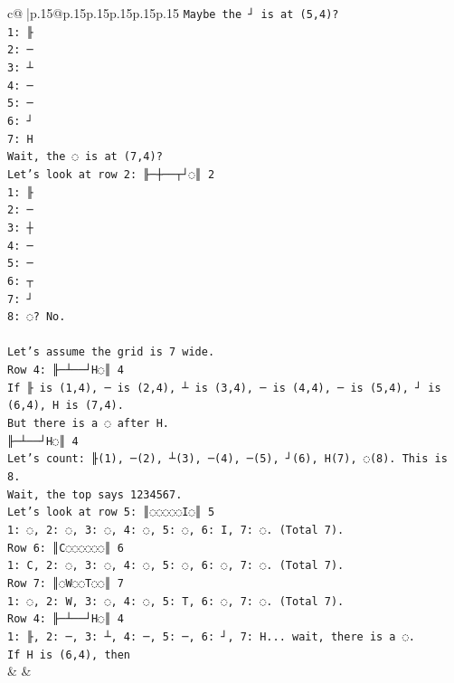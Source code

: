\documentclass{article}
\begin{document}
{\begin{supertabular}{c@{$\;$}|p{.15\linewidth}@{}p{.15\linewidth}p{.15\linewidth}p{.15\linewidth}p{.15\linewidth}p{.15\linewidth}}
{{{\texttt{Maybe the ┘ is at (5,4)?} \\
\texttt{1: ╟} \\
\texttt{2: ─} \\
\texttt{3: ┴} \\
\texttt{4: ─} \\
\texttt{5: ─} \\
\texttt{6: ┘} \\
\texttt{7: H} \\
\texttt{Wait, the ◌ is at (7,4)?} \\
\texttt{Let's look at row 2: ╟─┼──┬┘◌║ 2} \\
\texttt{1: ╟} \\
\texttt{2: ─} \\
\texttt{3: ┼} \\
\texttt{4: ─} \\
\texttt{5: ─} \\
\texttt{6: ┬} \\
\texttt{7: ┘} \\
\texttt{8: ◌? No.} \\
\\ 
\texttt{Let's assume the grid is 7 wide.} \\
\texttt{Row 4: ╟─┴──┘H◌║ 4} \\
\texttt{If ╟ is (1,4), ─ is (2,4), ┴ is (3,4), ─ is (4,4), ─ is (5,4), ┘ is (6,4), H is (7,4).} \\
\texttt{But there is a ◌ after H.} \\
\texttt{╟─┴──┘H◌║ 4} \\
\texttt{Let's count: ╟(1), ─(2), ┴(3), ─(4), ─(5), ┘(6), H(7), ◌(8). This is 8.} \\
\texttt{Wait, the top says  1234567.} \\
\texttt{Let's look at row 5: ║◌◌◌◌◌I◌║ 5} \\
\texttt{1: ◌, 2: ◌, 3: ◌, 4: ◌, 5: ◌, 6: I, 7: ◌. (Total 7).} \\
\texttt{Row 6: ║C◌◌◌◌◌◌║ 6} \\
\texttt{1: C, 2: ◌, 3: ◌, 4: ◌, 5: ◌, 6: ◌, 7: ◌. (Total 7).} \\
\texttt{Row 7: ║◌W◌◌T◌◌║ 7} \\
\texttt{1: ◌, 2: W, 3: ◌, 4: ◌, 5: T, 6: ◌, 7: ◌. (Total 7).} \\
\texttt{Row 4: ╟─┴──┘H◌║ 4} \\
\texttt{1: ╟, 2: ─, 3: ┴, 4: ─, 5: ─, 6: ┘, 7: H... wait, there is a ◌.} \\
\texttt{If H is (6,4), then} \\
            }
        }
    }
    & & \\ \\


\end{supertabular}}
\end{document}

